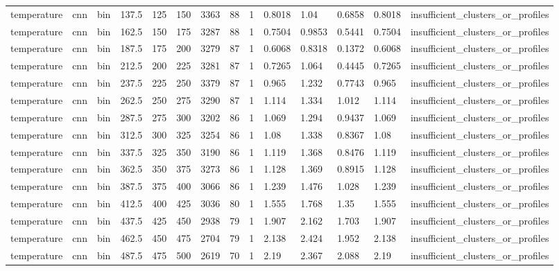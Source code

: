 \begin{table}[htbp]
\begin{tabular}{llllllllllllll}
temperature & cnn & bin & 137.5 & 125 & 150 & 3363 & 88 & 1 & 0.8018 & 1.04 & 0.6858 & 0.8018 & insufficient\_clusters\_or\_profiles \\
temperature & cnn & bin & 162.5 & 150 & 175 & 3287 & 88 & 1 & 0.7504 & 0.9853 & 0.5441 & 0.7504 & insufficient\_clusters\_or\_profiles \\
temperature & cnn & bin & 187.5 & 175 & 200 & 3279 & 87 & 1 & 0.6068 & 0.8318 & 0.1372 & 0.6068 & insufficient\_clusters\_or\_profiles \\
temperature & cnn & bin & 212.5 & 200 & 225 & 3281 & 87 & 1 & 0.7265 & 1.064 & 0.4445 & 0.7265 & insufficient\_clusters\_or\_profiles \\
temperature & cnn & bin & 237.5 & 225 & 250 & 3379 & 87 & 1 & 0.965 & 1.232 & 0.7743 & 0.965 & insufficient\_clusters\_or\_profiles \\
temperature & cnn & bin & 262.5 & 250 & 275 & 3290 & 87 & 1 & 1.114 & 1.334 & 1.012 & 1.114 & insufficient\_clusters\_or\_profiles \\
temperature & cnn & bin & 287.5 & 275 & 300 & 3202 & 86 & 1 & 1.069 & 1.294 & 0.9437 & 1.069 & insufficient\_clusters\_or\_profiles \\
temperature & cnn & bin & 312.5 & 300 & 325 & 3254 & 86 & 1 & 1.08 & 1.338 & 0.8367 & 1.08 & insufficient\_clusters\_or\_profiles \\
temperature & cnn & bin & 337.5 & 325 & 350 & 3190 & 86 & 1 & 1.119 & 1.368 & 0.8476 & 1.119 & insufficient\_clusters\_or\_profiles \\
temperature & cnn & bin & 362.5 & 350 & 375 & 3273 & 86 & 1 & 1.128 & 1.369 & 0.8915 & 1.128 & insufficient\_clusters\_or\_profiles \\
temperature & cnn & bin & 387.5 & 375 & 400 & 3066 & 86 & 1 & 1.239 & 1.476 & 1.028 & 1.239 & insufficient\_clusters\_or\_profiles \\
temperature & cnn & bin & 412.5 & 400 & 425 & 3036 & 80 & 1 & 1.555 & 1.768 & 1.35 & 1.555 & insufficient\_clusters\_or\_profiles \\
temperature & cnn & bin & 437.5 & 425 & 450 & 2938 & 79 & 1 & 1.907 & 2.162 & 1.703 & 1.907 & insufficient\_clusters\_or\_profiles \\
temperature & cnn & bin & 462.5 & 450 & 475 & 2704 & 79 & 1 & 2.138 & 2.424 & 1.952 & 2.138 & insufficient\_clusters\_or\_profiles \\
temperature & cnn & bin & 487.5 & 475 & 500 & 2619 & 70 & 1 & 2.19 & 2.367 & 2.088 & 2.19 & insufficient\_clusters\_or\_profiles \\

\end{tabular}
\end{table}
